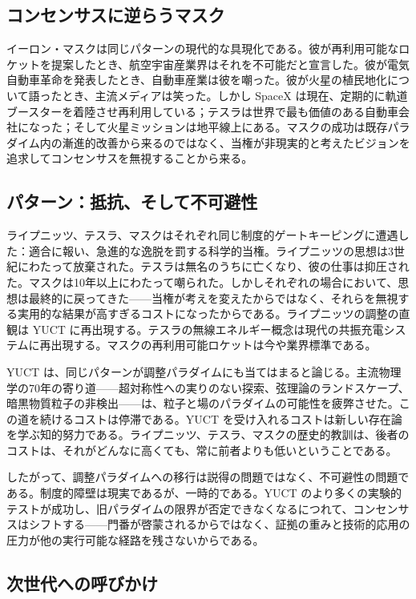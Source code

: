 \documentclass[12pt,a4paper]{article}
\begin{document}
	\subsection{コンセンサスに逆らうマスク}
	
	イーロン・マスクは同じパターンの現代的な具現化である。彼が再利用可能なロケットを提案したとき、航空宇宙産業界はそれを不可能だと宣言した。彼が電気自動車革命を発表したとき、自動車産業は彼を嘲った。彼が火星の植民地化について語ったとき、主流メディアは笑った。しかし SpaceX は現在、定期的に軌道ブースターを着陸させ再利用している；テスラは世界で最も価値のある自動車会社になった；そして火星ミッションは地平線上にある。マスクの成功は既存パラダイム内の漸進的改善から来るのではなく、当権が非現実的と考えたビジョンを追求してコンセンサスを無視することから来る。
	
	\subsection{パターン：抵抗、そして不可避性}
	
	ライプニッツ、テスラ、マスクはそれぞれ同じ制度的ゲートキーピングに遭遇した：適合に報い、急進的な逸脱を罰する科学的当権。ライプニッツの思想は3世紀にわたって放棄された。テスラは無名のうちに亡くなり、彼の仕事は抑圧された。マスクは10年以上にわたって嘲られた。しかしそれぞれの場合において、思想は最終的に戻ってきた——当権が考えを変えたからではなく、それらを無視する実用的な結果が高すぎるコストになったからである。ライプニッツの調整の直観は YUCT に再出現する。テスラの無線エネルギー概念は現代の共振充電システムに再出現する。マスクの再利用可能ロケットは今や業界標準である。
	
	YUCT は、同じパターンが調整パラダイムにも当てはまると論じる。主流物理学の70年の寄り道——超対称性への実りのない探索、弦理論のランドスケープ、暗黒物質粒子の非検出——は、粒子と場のパラダイムの可能性を疲弊させた。この道を続けるコストは停滞である。YUCT を受け入れるコストは新しい存在論を学ぶ知的努力である。ライプニッツ、テスラ、マスクの歴史的教訓は、後者のコストは、それがどんなに高くても、常に前者よりも低いということである。
	
	したがって、調整パラダイムへの移行は説得の問題ではなく、不可避性の問題である。制度的障壁は現実であるが、一時的である。YUCT のより多くの実験的テストが成功し、旧パラダイムの限界が否定できなくなるにつれて、コンセンサスはシフトする——門番が啓蒙されるからではなく、証拠の重みと技術的応用の圧力が他の実行可能な経路を残さないからである。
	
	\subsection{次世代への呼びかけ}
	
\end{document}
